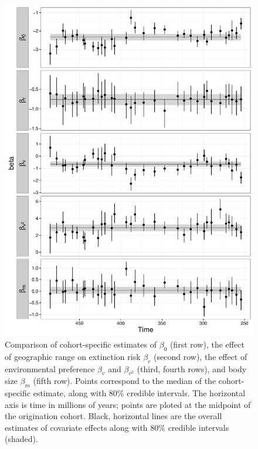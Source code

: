 \documentclass{article}
\begin{document}
\begin{figure}[ht]
  \centering
  \includegraphics[width = \textwidth,height = \textheight,keepaspectratio=true]{figure/cohort_series}
  \caption{Comparison of cohort-specific estimates of \(\beta_{0}\) (first row), the effect of geographic range on extinction risk \(\beta_{r}\) (second row), the effect of environmental preference \(\beta_{v}\) and \(\beta_{v^{2}}\) (third, fourth rows), and body size \(\beta_{m}\) (fifth row). Points correspond to the median of the cohort-specific estimate, along with 80\% credible intervals. The horizontal axis is time in millions of years; points are ploted at the midpoint of the origination cohort. Black, horizontal lines are the overall estimates of covariate effects along with 80\% credible intervals (shaded).}
  \label{fig:cohort_series}
\end{figure}
\end{document}
